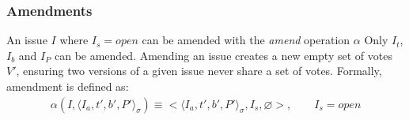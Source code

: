 \subsubsection{Amendments}

An issue $I$ where $I_s = open$ can be amended with the \emph{amend} operation
$\alpha$ Only $I_t$, $I_b$ and $I_P$ can be amended.  Amending an issue creates
a new empty set of votes $V'$, ensuring two versions of a given issue never
share a set of votes. Formally, amendment is defined as:
\begin{align*}
    \alpha(I, \langle I_a, t', b', P' \rangle_{\sigma}) \equiv \big<\langle I_a, t', b', P'
    \rangle_{\sigma}, I_s, \varnothing \big>, \qquad I_s = open
\end{align*}

